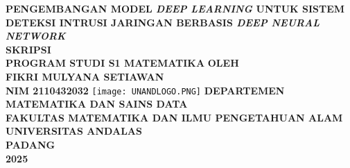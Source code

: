 \documentclass[a4paper,12pt]{report}
\begin{document}
\newcommand{\TTDKajur}[2]{%
   \begin{center}
     \begin{tabular}{c c c}
    Mengetahui, \\[-1em]
    Ketua Departemen\\[2.5em]
    \underline{#1} \\
    [-1.1em]
    {\small{NIP. #2}}
  	 \end{tabular}
   \end{center}
}

\newcommand{\TTDKosong}[4][5cm]{%
  \begin{tabular}{@{}p{#1}@{}}
  \end{tabular}
}

\begin{titlepage}
	\begin{center}
	\renewcommand{\baselinestretch}{2.0}\normalsize
	{\large \textbf{\textbf{PENGEMBANGAN MODEL \textit{DEEP LEARNING} UNTUK SISTEM DETEKSI INTRUSI JARINGAN BERBASIS \textit{DEEP NEURAL NETWORK}}}}\\
	\vfill
	{\large \textbf{SKRIPSI}}\\[1ex]
	{\large \textbf{PROGRAM STUDI S1 MATEMATIKA}}
	\vfill
	\textbf{OLEH}\\
	\textbf{{FIKRI MULYANA SETIAWAN}}\\
	\textbf{NIM 2110432032}
	\vfill
	\texttt{[image: UNANDLOGO.PNG]}
	\vfill
	{\textbf{DEPARTEMEN MATEMATIKA DAN SAINS DATA}}\\
	\textbf{FAKULTAS MATEMATIKA DAN ILMU PENGETAHUAN ALAM}\\
	\textbf{UNIVERSITAS ANDALAS}\\
	\textbf{PADANG}\\
	\textbf{2025}
	\end{center} 
\end{titlepage}
\thispagestyle{empty}
%
\newpage
{}
\tableofcontents
\newpage
\newpage
\renewcommand{\baselinestretch}{2.0}\normalsize
{} 
\listoffigures
\newpage
\renewcommand{\baselinestretch}{2.0}\normalsize
{}
\listoftables
\newpage
\renewcommand{\baselinestretch}{2.0}\normalsize
{}
{\listofappendices}
\end{document}
